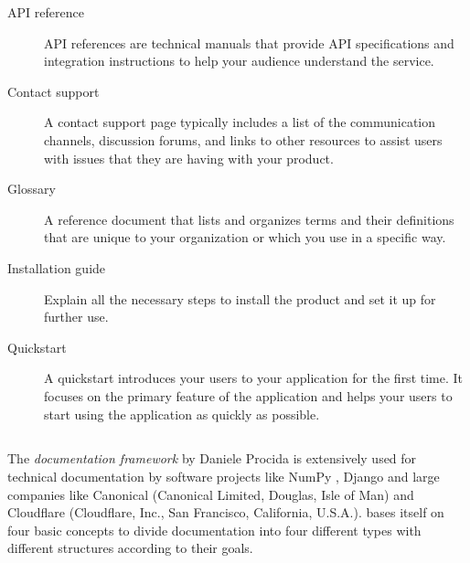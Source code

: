 \begin{description}
	\item[API reference] API references are technical manuals that provide API specifications and integration instructions to help your audience understand the service.
	\item[Contact support] A contact support page typically includes a list of the communication channels, discussion forums, and links to other resources to assist users with issues that they are having with your product.
	\item[Glossary] A reference document that lists and organizes terms and their definitions that are unique to your organization or which you use in a specific way.
	\item[Installation guide] Explain all the necessary steps to install the product and set it up for further use.
	\item[Quickstart] A quickstart introduces your users to your application for the first time. It focuses on the primary feature of the application and helps your users to start using the application as quickly as possible.
\end{description}


\subsection{\diatx}\label{s:diataxis}
The \textit{\diatx\space documentation framework} by Daniele Procida \cite{procidaDiataxisDocumentationFramework2023,aghajaniSoftwareDocumentationPractitioners2020}
is extensively used for technical documentation by software projects like NumPy \cite{harrisArrayProgrammingNumPy2020}, Django \cite{Django2013} and large companies like Canonical (Canonical Limited, Douglas, Isle of Man) and Cloudflare (Cloudflare, Inc., San Francisco, California, U.S.A.).
\diatx\space bases itself on four basic concepts to divide documentation into four different types with different structures according to their goals.\\


